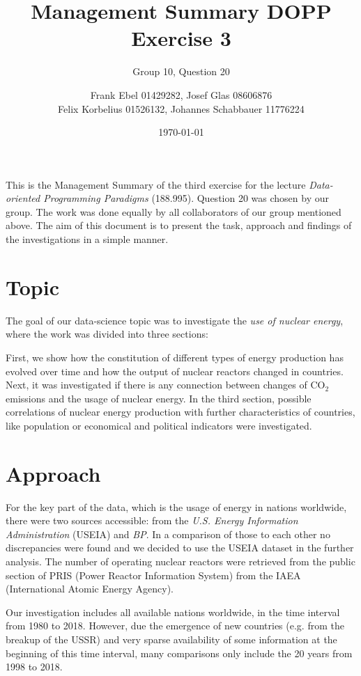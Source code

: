 \documentclass[a4paper,10pt,twocolumn]{scrartcl}
\author{Frank Ebel 01429282, Josef Glas 08606876\\Felix Korbelius 01526132, Johannes Schabbauer 11776224}
\title{\vspace*{-1cm}Management Summary DOPP Exercise 3}
\subtitle{Group 10, Question 20}
\date{\today \vspace*{-0.8cm}}
\begin{document}
\sffamily
\maketitle

This is the Management Summary of the third exercise for the lecture \emph{Data-oriented Programming Paradigms} (188.995).  Question 20 was chosen by our group. The work was done equally by all collaborators of our group mentioned above. The aim of this document is to present the task, approach and findings of the investigations in a simple manner.

\section{Topic}

The goal of our data-science topic was to investigate the \emph{use of nuclear energy}, where the work was divided into three sections:

First, we show how the constitution of different types of energy production has evolved over time and how the output of nuclear reactors changed in countries. Next, it was investigated if there is any connection between changes of CO$_2$ emissions and the usage of nuclear energy. In the third section, possible correlations of nuclear energy production with further characteristics of countries, like population or economical and political indicators were investigated.

\section{Approach}

For the key part of the data, which is the usage of energy in nations worldwide, there were two sources accessible: from the \emph{U.S. Energy Information Administration} (USEIA) and \emph{BP}. In a comparison of those to each other no discrepancies were found and we decided to use the USEIA dataset in the further analysis. 
The number of operating nuclear reactors were retrieved from the public section of PRIS (Power Reactor Information System) from the IAEA (International Atomic Energy Agency).

Our investigation includes all available nations worldwide, in the time interval from 1980 to 2018. However, due the emergence of new countries (e.g. from the breakup of the USSR) and very sparse availability of some information at the beginning of this time interval, many comparisons only include the 20 years from 1998 to 2018. 
\end{document}
